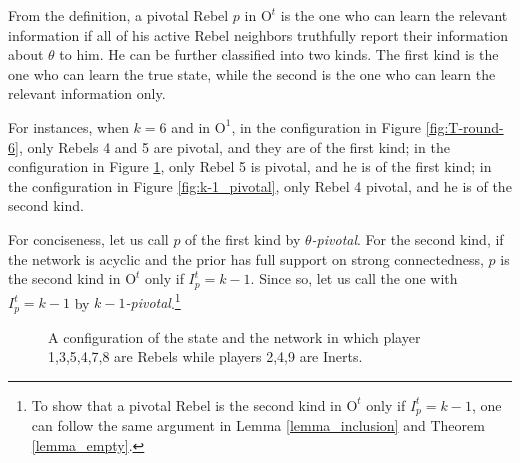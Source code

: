 \documentclass[12pt,letter]{article}
\newcommand{\Omicron}{\mathrm{O}}
\theoremstyle{definition}
\theoremstyle{remark}
\theoremstyle{claim}
\begin{document}
From the definition, a pivotal Rebel $p$ in $\Omicron^t$ is the one who can learn the relevant information if all of his active Rebel neighbors truthfully report their information about $\theta$ to him. He can be further classified into two kinds. The first kind is the one who can learn the true state, while the second is the one who can learn the relevant information only. 

For instances, when $k=6$ and in $\Omicron^1$, in the configuration in Figure \ref{fig:T-round-6}, only Rebels 4 and 5 are pivotal, and they are of the first kind; in the configuration in Figure \ref{fig:central_pivotal}, only Rebel 5 is pivotal, and he is of the first kind; in the configuration in Figure \ref{fig:k-1_pivotal}, only Rebel 4 pivotal, and he is of the second kind.

For conciseness, let us call $p$ of the first kind by \textit{$\theta$-pivotal}. For the second kind, if the network is acyclic and the prior has full support on strong connectedness, $p$ is the second kind in $\Omicron^{t}$ only if $I^{t}_p=k-1$. Since so, let us call the one with $I^t_p=k-1$ by \textit{$k-1$-pivotal}.\footnote{To show that a pivotal Rebel is the second kind in $\Omicron^{t}$ only if $I^{t}_p=k-1$, one can follow the same argument in Lemma \ref{lemma_inclusion} and Theorem \ref{lemma_empty}.}

\begin{figure}

\label{fig:central_pivotal}
\begin{center}
\end{center}
\caption{A configuration of the state and the network in which player 1,3,5,4,7,8 are Rebels while players 2,4,9 are Inerts.}
\end{figure}
\end{document}
